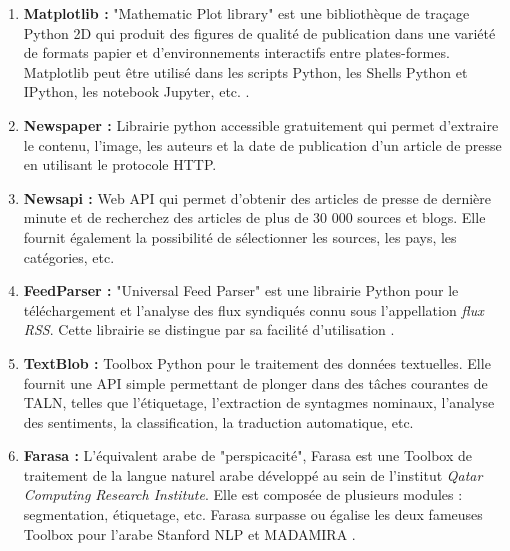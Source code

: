\begin{enumerate}
                \item{\textbf{Matplotlib : }}
                "Mathematic Plot library" est une bibliothèque de traçage Python 2D qui produit des figures de qualité de publication dans une variété de formats papier et d'environnements interactifs entre plates-formes. Matplotlib peut être utilisé dans les scripts Python, les Shells Python et IPython, les notebook Jupyter, etc. \cite{matplotlib}.\\

                \item{\textbf{Newspaper : }}
                Librairie python accessible gratuitement qui permet d'extraire le contenu, l'image, les auteurs et la date de publication d'un article de presse en utilisant le protocole HTTP.\\

                \item{\textbf{Newsapi : }}
                Web API qui permet d'obtenir des articles de presse de dernière minute et de recherchez des articles de plus de 30 000 sources et blogs. Elle fournit également la possibilité de sélectionner les sources, les pays, les catégories, etc.\\

                \item{\textbf{FeedParser : }}
                "Universal Feed Parser" est une librairie Python pour le téléchargement et l'analyse des flux syndiqués connu sous l'appellation \emph{flux RSS}. Cette librairie se distingue par sa facilité d'utilisation \cite{feedparser}.\\

                \item{\textbf{TextBlob : }}
                Toolbox Python pour le traitement des données textuelles. Elle fournit une API simple permettant de plonger dans des tâches courantes de TALN, telles que l'étiquetage, l'extraction de syntagmes nominaux, l'analyse des sentiments, la classification, la traduction automatique, etc. \cite{textblob}\\

                \item{\textbf{Farasa : }}
                L'équivalent arabe de "perspicacité", Farasa est une Toolbox de traitement de la langue naturel arabe développé au sein de l'institut \emph{Qatar Computing Research Institute}. Elle est composée de plusieurs modules : segmentation, étiquetage, etc. Farasa surpasse ou égalise les deux fameuses Toolbox pour l'arabe Stanford NLP et MADAMIRA \cite{farasa}.\\


\end{enumerate}
